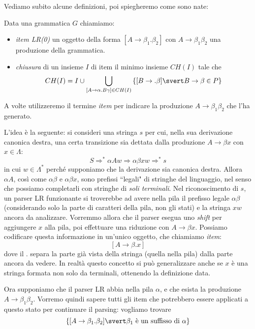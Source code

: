 \documentclass[12pt]{article}
\numberwithin{theorem}{subsection}
\begin{document}
Vediamo subito alcune definizioni, poi spiegheremo come sono nate:
\begin{definition}
	Data una grammatica $G$ chiamiamo:
	\begin{itemize}
		\item \textit{item LR(0)} un oggetto della forma $[ A \rightarrow \beta_1 . \beta_2 ]$ con $A \rightarrow \beta_1 \beta_2$ una produzione della grammatica.
		\item \textit{chiusura} di un insieme $I$ di item il minimo insieme $CH(I)$ tale che
		\[
		CH(I) = I \cup \bigcup\limits_{[ A \rightarrow \alpha . B\gamma ] \in CH(I)} \left\lbrace [ B \rightarrow . \beta ] \svert B \rightarrow \beta \in P \right\rbrace
		\]
	\end{itemize}

	A volte utilizzeremo il termine \textit{item} per indicare la produzione $A \rightarrow \beta_1 \beta_2$ che l'ha generato.
\end{definition}

L'idea è la seguente: si consideri una stringa $s$ per cui, nella sua derivazione canonica destra, una certa transizione sia dettata dalla produzione $A \rightarrow \beta x$ con $x \in \Lambda$:
\[ S \Rightarrow^* \alpha A w \Rightarrow \alpha \beta x w \Rightarrow^* s \]
in cui $w \in \Lambda^*$ perché supponiamo che la derivazione sia canonica destra.
Allora $\alpha A$, così come $\alpha \beta$ e $\alpha \beta x$, sono prefissi ``legali" di stringhe del linguaggio, nel senso che possiamo completarli con stringhe di \textit{soli terminali}. Nel riconoscimento di $s$, un parser LR funzionante si troverebbe ad avere nella pila il prefisso legale $\alpha \beta$ (considerando solo la parte di caratteri della pila, non gli stati) e la stringa $xw$ ancora da analizzare. Vorremmo allora che il parser esegua uno \textit{shift} per aggiungere $x$ alla pila, poi effettuare una riduzione con $A \rightarrow \beta x$. Possiamo codificare questa informazione in un'unico oggetto, che chiamiamo \textit{item}:
\[
[ A \rightarrow \beta . x ]
\]
dove il $.$ separa la parte già vista della stringa (quella nella pila) dalla parte ancora da vedere. In realtà questo concetto si può generalizzare anche se $x$ è una stringa formata non solo da terminali, ottenendo la definizione data.

Ora supponiamo che il parser LR abbia nella pila $\alpha$, e che esista la produzione $A \rightarrow \beta_1 \beta_2$. Vorremo quindi sapere tutti gli item che potrebbero essere applicati a questo stato per continuare il parsing: vogliamo trovare
\[
\left\lbrace [ A \rightarrow \beta_1 . \beta_2 ] \svert \beta_1 \text{ è  un suffisso di } \alpha \right\rbrace
\]
\end{document}
